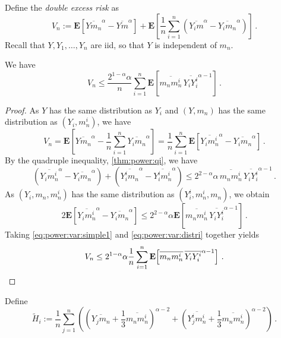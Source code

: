 \documentclass{article}
\newcommand{\lab}{\left[} %
\newcommand{\rab}{\right]} %
\newcommand{\ab}[1]{\lab #1 \rab} %
\newcommand{\abOf}[1]{\!\ab{#1}} %
\newcommand{\lb}{\left(} %
\newcommand{\rb}{\right)} %
\newcommand{\br}[1]{\lb #1 \rb} %
\newcommand{\E}{\mathbf{E}} %
\newcommand{\EOf}[1]{\E\abOf{#1}}
\newcommand{\eqfs}{\,.}
\newcommand{\ol}[2]{\overline{#1#2}}
\begin{document}
Define the \emph{double excess risk} as
\begin{equation}
    V_n := \EOf{\ol Y{m_n}^\alpha - \ol Ym^\alpha} + \EOf{\frac1n \sum_{i=1}^n \br{\ol {Y_i}{m}^\alpha - \ol {Y_i}{m_n}^\alpha} }
    \eqfs
\end{equation}
Recall that $Y, Y_1, \dots, Y_n$ are iid, so that $Y$ is independent of $m_n$.
%
\begin{lemma}\label{lmm:power:variancebound}
	We have
    \begin{equation}
        V_n \leq \frac{2^{1-\alpha} \alpha}n \sum_{i=1}^n \EOf{\ol {m_n}{m_n^i}\, \ol {Y_i}{Y_i^i}^{\alpha-1}}
        \eqfs
    \end{equation}
\end{lemma}
%
\begin{proof}
    As $Y$ has the same distribution as $Y_i$ and $(Y, m_n)$ has the same distribution as $(Y_i, m_n^i)$, we have
    \begin{equation}\label{eq:power:var:simple1}
        V_n 
        =
        \EOf{\ol Y{m_n}^\alpha - \frac1n \sum_{i=1}^n \ol {Y_i}{m_n}^\alpha} 
        =
        \frac1n \sum_{i=1}^n \EOf{\ol {Y_i}{m_n^i}^\alpha - \ol {Y_i}{m_n}^\alpha} 
        \eqfs
    \end{equation}
    By the quadruple inequality, \cref{thm:power:qi}, we have 
    \begin{equation}
        \br{\ol {Y_i}{m_n^i}^\alpha - \ol {Y_i}{m_n}^\alpha}
        + 
        \br{\ol {Y_i^i}{m_n}^\alpha - \ol {Y_i^i}{m_n^i}^\alpha}
        \leq
        2^{2-\alpha} \alpha \,\ol {m_n}{m_n^i} \,\ol {Y_i}{Y_i^i}^{\alpha-1}
        \eqfs
    \end{equation}
    As $(Y_i, m_n, m_n^i)$ has the same distribution as $(Y_i^i, m_n^i, m_n)$, we obtain
    \begin{equation}\label{eq:power:var:distri}
        2 \EOf{\ol {Y_i}{m_n^i}^\alpha - \ol {Y_i}{m_n}^\alpha} \leq 2^{2-\alpha} \alpha \EOf{\ol {m_n}{m_n^i} \,\ol {Y_i}{Y_i^i}^{\alpha-1}}
        \eqfs
    \end{equation}
    Taking \eqref{eq:power:var:simple1} and \eqref{eq:power:var:distri} together yields
    \begin{equation}
        V_n \leq 2^{1-\alpha} \alpha \frac1n \sum_{i=1}^n \EOf{\ol {m_n}{m_n^i} \,\ol {Y_i}{Y_i^i}^{\alpha-1}}
        \eqfs
		\qedhere
    \end{equation}
\end{proof}
%
Define
%
\begin{equation}
    \tilde H_i := \frac1n \sum_{j=1}^n \br{\br{\ol {Y_j}{m_n} + \frac13\ol {m_n}{m_n^i}}^{\alpha-2} + \br{\ol {Y_j^i}{m_n^i} + \frac13\ol{m_n}{m_n^i}}^{\alpha-2}}
    \eqfs
\end{equation}
\end{document}
